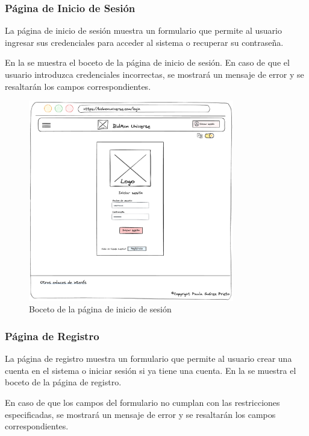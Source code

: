 \subsubsection{Página de Inicio de Sesión}
La página de inicio de sesión muestra un formulario que permite al usuario ingresar sus credenciales para acceder al sistema o recuperar su contraseña.

En la  se muestra el boceto de la página de inicio de sesión.
En caso de que el usuario introduzca credenciales incorrectas, se mostrará un mensaje de error y se resaltarán los campos correspondientes.

\begin{figure}[H]
    \centering
    \includegraphics[width=0.8\textwidth]{figures/6-Analisis/6-Interfaz/prototipos/login.png}
    \caption{Boceto de la página de inicio de sesión}
    \label{fig:p_login}
    \hypertarget{fig:p_login}{}
\end{figure}

\subsubsection{Página de Registro}
La página de registro muestra un formulario que permite al usuario crear una cuenta en el sistema o iniciar sesión si ya tiene una cuenta.
En la  se muestra el boceto de la página de registro.

En caso de que los campos del formulario no cumplan con las restricciones especificadas, se mostrará un mensaje de error y se resaltarán los campos correspondientes.

